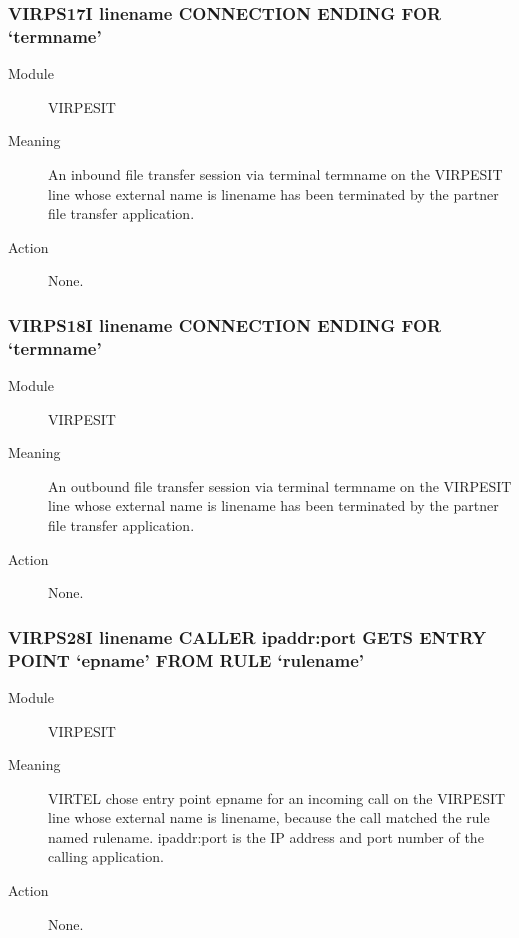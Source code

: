 \documentclass[letterpaper,10pt,english]{sphinxmanual}
\begin{document}
\subsubsection{VIRPS17I linename CONNECTION ENDING FOR ‘termname’}
\label{\detokenize{messages:virps17i-linename-connection-ending-for-termname}}\begin{description}
\item[{Module}] \leavevmode
VIRPESIT

\item[{Meaning}] \leavevmode
An inbound file transfer session via terminal termname on the VIRPESIT line whose external name is linename has been terminated by the partner file transfer application.

\item[{Action}] \leavevmode
None.

\end{description}


\subsubsection{VIRPS18I linename CONNECTION ENDING FOR ‘termname’}
\label{\detokenize{messages:virps18i-linename-connection-ending-for-termname}}\begin{description}
\item[{Module}] \leavevmode
VIRPESIT

\item[{Meaning}] \leavevmode
An outbound file transfer session via terminal termname on the VIRPESIT line whose external name is linename has been terminated by the partner file transfer application.

\item[{Action}] \leavevmode
None.

\end{description}


\subsubsection{VIRPS28I linename CALLER ipaddr:port GETS ENTRY POINT ‘epname’ FROM RULE ‘rulename’}
\label{\detokenize{messages:virps28i-linename-caller-ipaddr-port-gets-entry-point-epname-from-rule-rulename}}\begin{description}
\item[{Module}] \leavevmode
VIRPESIT

\item[{Meaning}] \leavevmode
VIRTEL chose entry point epname for an incoming call on the VIRPESIT line whose external name is linename, because the call matched the rule named rulename. ipaddr:port is the IP address and port number of the calling application.

\item[{Action}] \leavevmode
None.

\end{description}
\end{document}
